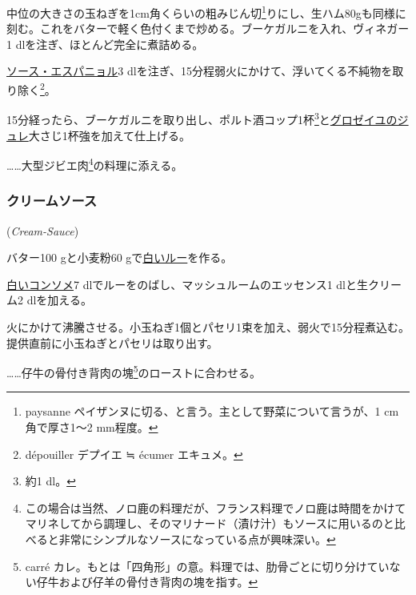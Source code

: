 \begin{recette}
中位の大きさの玉ねぎを1cm角くらいの粗みじん切\footnote{paysanne
  ペイザンヌに切る、と言う。主として野菜について言うが、1 cm角で厚さ1〜2
  mm程度。}りにし、生ハム80gも同様に刻む。これをバターで軽く色付くまで炒める。ブーケガルニを入れ、ヴィネガー1\undemi{}
dlを注ぎ、ほとんど完全に煮詰める。

\protect\hyperlink{sauce-espagnole}{ソース・エスパニョル}3
dlを注ぎ、15分程弱火にかけて、浮いてくる不純物を取り除く\footnote{dépouiller
  デプイエ ≒ écumer エキュメ。}。

15分経ったら、ブーケガルニを取り出し、ポルト酒コップ1杯\footnote{約1
  dl。}と\protect\hyperlink{}{グロゼイユのジュレ}大さじ1杯強を加えて仕上げる。

\ldots{}\ldots{}大型ジビエ肉\footnote{この場合は当然、ノロ鹿の料理だが、フランス料理でノロ鹿は時間をかけてマリネしてから調理し、そのマリナード（漬け汁）もソースに用いるのと比べると非常にシンプルなソースになっている点が興味深い。}の料理に添える。

\maeaki

\hypertarget{cream-sauce}{%
\subsubsection{クリームソース}\label{cream-sauce}}

\hspace{1em}(\emph{Cream-Sauce})


バター100 gと小麦粉60
gで\protect\hyperlink{roux-blanc}{白いルー}を作る。

\protect\hyperlink{consomme-blanc}{白いコンソメ}7
dlでルーをのばし、マッシュルームのエッセンス1 dlと生クリーム2
dlを加える。

火にかけて沸騰させる。小玉ねぎ1個とパセリ1束を加え、弱火で15分程煮込む。提供直前に小玉ねぎとパセリは取り出す。

\ldots{}\ldots{}仔牛の骨付き背肉の塊\footnote{carré
  カレ。もとは「四角形」の意。料理では、肋骨ごとに切り分けていない仔牛および仔羊の骨付き背肉の塊を指す。}のローストに合わせる。


\end{recette}

